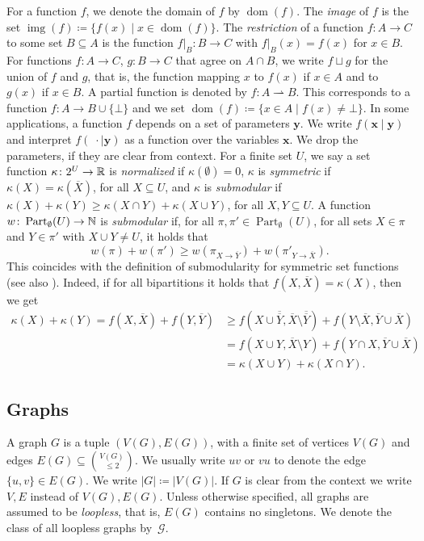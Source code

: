 \documentclass{lmcs}
\theoremstyle{plain}\newtheorem{claim}[thm]{Claim}   %
\newcommand{\NN}{\ensuremath \mathbb{N}}
\newcommand{\RR}{\ensuremath \mathbb{R}}
\newcommand{\cG}{\ensuremath{\mathcal G}}
\DeclareMathOperator{\dom}{dom}
\DeclareMathOperator{\img}{img}
\DeclareMathOperator{\partitions}{Part}
\newcommand{\partitionsEmpty}{\ensuremath{\partitions_\emptyset}}
\newcommand{\ext}{\ensuremath{\rightarrow}}
\newcommand{\complementOf}[1]{\ensuremath{\overline{#1}}}
\newcommand{\complementOfB}[1]{\complementOf{#1}}
\renewcommand{\vec}[1]{\ensuremath{\boldsymbol{#1}}}
\newcommand{\fktmid}{\ensuremath{\mid}}
\newcommand{\restrict}[1]{\vert_{#1}}
\newcommand{\parto}{\ensuremath{\rightharpoonup}}
\newcommand{\submod}{submodular}
\begin{document}
For a function $f$, we denote the domain of $f$ by $\dom(f)$.
The \emph{image} of $f$ is the set $\img(f) \coloneqq \{f(x) \mid x \in \dom(f)\}$.
The \emph{restriction} of a function $f \colon A \to C$ to some set $B \subseteq A$ is the function $f\restrict{B} \colon B \to C$ with $f\restrict{B}(x) = f(x)$ for $x \in B$.
For functions $f \colon A \to C$, $g \colon B \to C$ that agree on $A \cap B$, we write $f \sqcup g$ for the union of $f$ and $g$, that is, the function mapping $x$ to $f(x)$ if $x \in A$ and to $g(x)$ if $x \in B$.
A partial function is denoted by $f\colon A \parto B$.
This corresponds to a function $f\colon A\to B \cup \{\bot\}$ and we set $\dom(f)\coloneqq \{ x\in A \mid f(x)\neq \bot\}$.
In some applications, a function $f$ depends on a set of parameters $\vec{y}$.
We write $f(\vec{x}\fktmid \vec{y})$ and interpret $f(\phantom{|} \cdot \fktmid \vec{y})$ as a function over the variables $\vec{x}$.
We drop the parameters, if they are clear from context.
For a finite set $U$, we say a set function $\kappa\colon 2^U\rightarrow \RR$ is \emph{normalized} if $\kappa(\emptyset)=0$, $\kappa$ is \emph{symmetric} if $\kappa(X)=\kappa(\complementOf{X})$, for all $X\subseteq U$, and $\kappa$ is \emph{submodular} if $\kappa(X)+\kappa(Y) \geq \kappa(X\cap Y)+\kappa(X\cup Y)$, for all $X,Y\subseteq U$.
A function $w\colon \partitionsEmpty(U)\rightarrow \NN$ is \emph{\submod} if, for all $\pi,\pi'\in \partitionsEmpty(U)$, for all sets $X\in \pi$ and $Y\in \pi'$ with $X\cup Y \neq U$, it holds that
\[w(\pi)+w(\pi')\geq w(\pi_{X\ext \complementOf{Y}})+w(\pi'_{Y\ext \complementOf{X}}).\]
This coincides with the definition of submodularity for symmetric set functions (see also \cite{Amini_submod-partition_09}). Indeed, if for all bipartitions it holds that $f(X,\complementOf{X})=\kappa(X)$, then we get
\begin{align*}
	\kappa(X) + \kappa(Y) = f(X,\complementOf{X}) + f(Y,\complementOf{Y}) &\geq f(X\cup\complementOfB{\complementOf{Y}},\complementOf{X}\setminus\complementOfB{\complementOf{Y}}) + f(Y\setminus\complementOf{X},\complementOf{Y}\cup\complementOf{X})\\
	& = f(X\cup Y,\complementOf{X}\setminus Y) + f(Y\cap X, \complementOf{Y}\cup\complementOf{X})\\
	& = \kappa(X\cup Y) + \kappa(X\cap Y).
\end{align*}

\subsection{Graphs}
A graph $G$ is a tuple $(V(G), E(G))$, with a finite set of vertices $V(G)$ and edges $E(G) \subseteq \binom{V(G)}{\leq 2}$.
We usually write $uv$ or $vu$ to denote the edge $\{u, v\} \in E(G)$.
We write $|G|\coloneqq|V(G)|$.
If \(G\) is clear from the context we write \(V,E\) instead of \(V(G),E(G)\).
Unless otherwise specified, all graphs are assumed to be \emph{loopless}, that is, $E(G)$ contains no singletons. 
We denote the class of all loopless graphs by~$\cG$.
\end{document}

